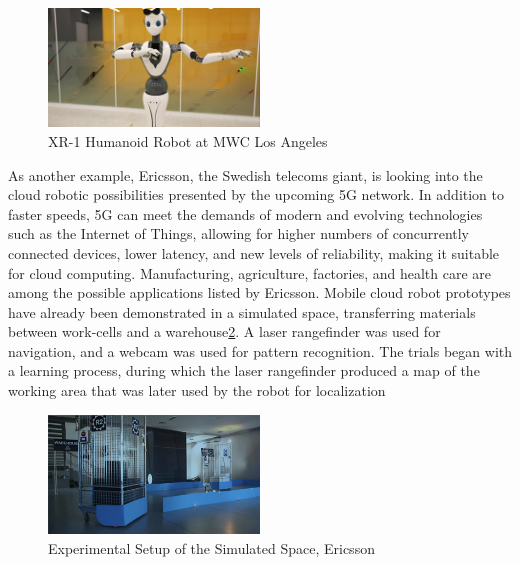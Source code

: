 \documentclass[conference]{IEEEtran}
\begin{document}
\begin{figure}[h]
    \centerline{\includegraphics[width=0.5\textwidth]{prerak_images/Picture2.png}}
    \caption{XR-1 Humanoid Robot at MWC Los Angeles\autocite{4demaitre_demaitre_2020}}
\label{prerakfig2}
\end{figure}

As another example, Ericsson, the Swedish telecoms giant, is looking into the cloud robotic possibilities presented by the upcoming 5G network. In addition to faster speeds, 5G can meet the demands of modern and evolving technologies such as the Internet of Things, allowing for higher numbers of concurrently connected devices, lower latency, and new levels of reliability, making it suitable for cloud computing. Manufacturing, agriculture, factories, and health care are among the possible applications listed by Ericsson. Mobile cloud robot prototypes have already been demonstrated in a simulated space, transferring materials between work-cells and a warehouse\ref{prerakfig3}. A laser rangefinder was used for navigation, and a webcam was used for pattern recognition. The trials began with a learning process, during which the laser rangefinder produced a map of the working area that was later used by the robot for localization\autocite{3bogue2017cloud}

\begin{figure}[h]
    \centerline{\includegraphics[width=0.5\textwidth]{prerak_images/Picture3.png}}
    \caption{Experimental Setup of the Simulated Space, Ericsson\autocite{3bogue2017cloud}}
\label{prerakfig3}
\end{figure}
\end{document}
